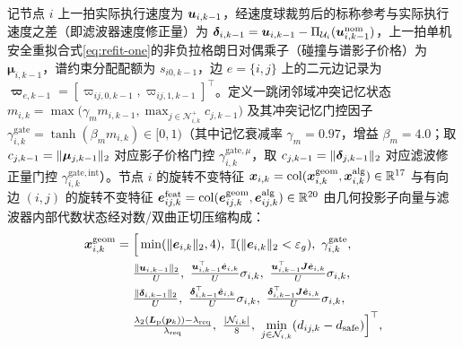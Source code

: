 记节点 $i$ 上一拍实际执行速度为 $\boldsymbol{u}_{i,k-1}$，经速度球裁剪后的标称参考与实际执行速度之差（即滤波器速度修正量）为 $\boldsymbol\delta_{i,k-1}=\boldsymbol{u}_{i,k-1}-\Pi_{\mathcal U_i}(\boldsymbol{u}_{i,k-1}^{\mathrm{nom}})$，上一拍单机安全重拟合式\eqref{eq:refit-one}的非负拉格朗日对偶乘子（碰撞与谱影子价格）为 $\boldsymbol\mu_{i,k-1}$，谱约束分配配额为 $s_{i0,k-1}$，边 $e=\{i,j\}$ 上的二元边记录为 $\boldsymbol\varpi_{e,k-1}=[\varpi_{ij,0,k-1},\varpi_{ij,1,k-1}]^{\top}$。定义一跳闭邻域冲突记忆状态 $m_{i,k}=\max\bigl(\gamma_m m_{i,k-1},\max_{j\in\mathcal N_{i,k}^+}c_{j,k-1}\bigr)$ 及其冲突记忆门控因子 $\gamma_{i,k}^{\mathrm{gate}}=\tanh(\beta_m m_{i,k})\in[0,1)$（其中记忆衰减率 $\gamma_m=0.97$，增益 $\beta_m=4.0$；取 $c_{j,k-1}=\lVert\boldsymbol\mu_{j,k-1}\rVert_2$ 对应影子价格门控 $\gamma_{i,k}^{\mathrm{gate},\mu}$，取 $c_{j,k-1}=\lVert\boldsymbol\delta_{j,k-1}\rVert_2$ 对应滤波修正量门控 $\gamma_{i,k}^{\mathrm{gate,int}}$）。节点 $i$ 的旋转不变特征 $\boldsymbol x_{i,k}=\operatorname{col}(\boldsymbol x_{i,k}^{\mathrm{geom}},\boldsymbol x_{i,k}^{\mathrm{alg}})\in\mathbb R^{17}$ 与有向边 $(i,j)$ 的旋转不变特征 $\boldsymbol e_{ij,k}^{\mathrm{feat}}=\operatorname{col}(\boldsymbol e_{ij,k}^{\mathrm{geom}},\boldsymbol e_{ij,k}^{\mathrm{alg}})\in\mathbb R^{20}$ 由几何投影子向量与滤波器内部代数状态经对数/双曲正切压缩构成：
\begin{equation}
\begin{split}
 \boldsymbol x_{i,k}^{\mathrm{geom}}&=\Big[\min(\norm{\be_{i,k}}_2,4),\ \mathbb I(\norm{\be_{i,k}}_2<\varepsilon_g),\ \gamma_{i,k}^{\mathrm{gate}},\\
 &\quad\ \tfrac{\norm{\bu_{i,k-1}}_2}{U},\ \tfrac{\bu_{i,k-1}^{\top}\hat{\be}_{i,k}}{U}\sigma_{i,k},\ \tfrac{\bu_{i,k-1}^{\top}\bJ\hat{\be}_{i,k}}{U}\sigma_{i,k},\\
 &\quad\ \tfrac{\norm{\boldsymbol\delta_{i,k-1}}_2}{U},\ \tfrac{\boldsymbol\delta_{i,k-1}^{\top}\hat{\be}_{i,k}}{U}\sigma_{i,k},\ \tfrac{\boldsymbol\delta_{i,k-1}^{\top}\bJ\hat{\be}_{i,k}}{U}\sigma_{i,k},\\
 &\quad\ \tfrac{\lambda_2(\bL(\bp_k))-\lr}{\lr},\ \tfrac{|\mathcal N_{i,k}|}{8},\ \min_{j\in\mathcal N_{i,k}}(d_{ij,k}-\ds)\Big]^{\top},
\end{split}\label{eq:node-geom}
\end{equation}
